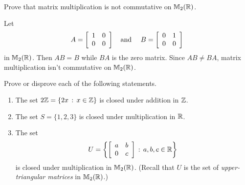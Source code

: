 \begin{exercise}[ID=2E]
Prove that matrix multiplication is not commutative on $\mathbb{M}_2(\mathbb{R})$.
\end{exercise}

\begin{solution}[print=true]
Let $$A=\left[
          \begin{array}{cc}
            1 & 0 \\
            0 & 0 \\
          \end{array}
        \right] \mbox{\quad and \quad}B=\left[
          \begin{array}{cc}
            0 & 1 \\
            0 & 0 \\
          \end{array}
        \right]$$ in $\mathbb{M}_2(\mathbb{R})$.  Then $AB=B$ while $BA$ is the zero matrix.  Since $AB\neq BA$, matrix multiplication isn't commutative on $\mathbb{M}_2(\mathbb{R})$.
\end{solution}


\begin{exercise}[ID=2G]
Prove or disprove each of the following statements.

\begin{enumerate}
\item The set $2\mathbb{Z}=\{2x\,:\,x\in \mathbb{Z}\}$ is closed under addition in $\mathbb{Z}$.
\item The set $S=\{1,2,3\}$ is closed under multiplication in $\mathbb{R}$.
\item The set $$U=\left\{\left[
                     \begin{array}{cc}
                      a & b \\
                       0 & c \\
                     \end{array}
                   \right]\,:\, a,b,c\in \mathbb{R} \right\}$$ is closed under multiplication in $\mathbb{M}_2(\mathbb{R})$. (Recall that $U$ is  the set of \textit{upper-triangular matrices} in $\mathbb{M}_2(\mathbb{R})$.)
\end{enumerate}

\end{exercise}

